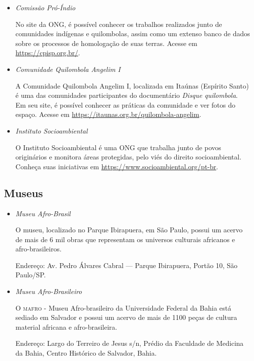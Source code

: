 \documentclass[11pt]{extarticle}
\begin{document}
\begin{itemize}

\item \textit{Comissão Pró-Índio}

No site da ONG, é possível conhecer os trabalhos realizados junto de comunidades indígenas e quilombolas, assim como um extenso banco de dados sobre os processos de homologação de suas terras. Acesse em \url{https://cpisp.org.br/}.

\item \textit{Comunidade Quilombola Angelim I}

A Comunidade Quilombola Angelim I, localizada em Itaúnas (Espírito Santo) é uma das comunidades participantes do documentário \textit{Disque quilombola}. Em seu site, é possível conhecer as práticas da comunidade e ver fotos do espaço. Acesse em \url{https://itaunas.org.br/quilombola-angelim}.

\item \textit{Instituto Socioambiental}

O Instituto Socioambiental é uma ONG que trabalha junto de povos originários e monitora áreas protegidas, pelo viés do direito socioambiental. Conheça suas iniciativas em \url{https://www.socioambiental.org/pt-br}.

\end{itemize}

\subsection{Museus}

\begin{itemize}

\item \textit{Museu Afro-Brasil}

O museu, localizado no Parque Ibirapuera, em São Paulo, possui um acervo de mais de 6 mil obras que representam os universos culturais africanos e afro-brasileiros.

Endereço: Av. Pedro Álvares Cabral — Parque Ibirapuera, Portão 10, São Paulo/SP.

\item \textit{Museu Afro-Brasileiro}

O \textsc{mafro} - Museu Afro-brasileiro da Universidade Federal da Bahia está sediado em Salvador e possui um acervo de mais de 1100 peças de cultura material africana e afro-brasileira.

Endereço: Largo do Terreiro de Jesus s/n, Prédio da Faculdade de Medicina da Bahia, Centro Histórico de Salvador, Bahia.

\end{itemize}
\end{document}
